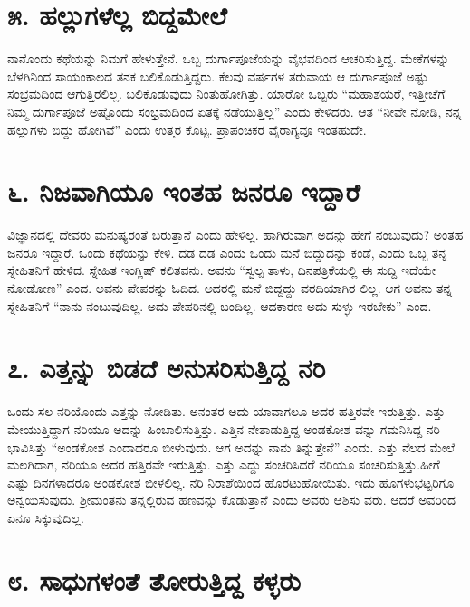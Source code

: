 \section{\num{೫.} ಹಲ್ಲುಗಳೆಲ್ಲ ಬಿದ್ದಮೇಲೆ}

ನಾನೊಂದು ಕಥೆಯನ್ನು ನಿಮಗೆ ಹೇಳುತ್ತೇನೆ. ಒಬ್ಬ ದುರ್ಗಾಪೂಜೆಯನ್ನು ವೈಭವದಿಂದ ಆಚರಿಸುತ್ತಿದ್ದ. ಮೇಕೆಗಳನ್ನು ಬೆಳಗಿನಿಂದ ಸಾಯಂಕಾಲದ ತನಕ ಬಲಿಕೊಡುತ್ತಿದ್ದರು. ಕೆಲವು ವರ್ಷಗಳ ತರುವಾಯ ಆ ದುರ್ಗಾಪೂಜೆ ಅಷ್ಟು ಸಂಭ್ರಮದಿಂದ ಆಗುತ್ತಿರಲಿಲ್ಲ. ಬಲಿಕೊಡುವುದು ನಿಂತುಹೋಗಿತ್ತು. ಯಾರೋ ಒಬ್ಬರು “ಮಹಾಶಯರೆ, ಇತ್ತೀಚೆಗೆ ನಿಮ್ಮ ದುರ್ಗಾಪೂಜೆ ಅಷ್ಟೊಂದು ಸಂಭ್ರಮದಿಂದ ಏತಕ್ಕೆ ನಡೆಯುತ್ತಿಲ್ಲ” ಎಂದು ಕೇಳಿದರು. ಆತ “ನೀವೇ ನೋಡಿ, ನನ್ನ ಹಲ್ಲುಗಳು ಬಿದ್ದು ಹೋಗಿವೆ” ಎಂದು ಉತ್ತರ ಕೊಟ್ಟ. ಪ್ರಾಪಂಚಿಕರ ವೈರಾಗ್ಯವೂ ಇಂತಹುದೇ.


\section{\num{೬.} ನಿಜವಾಗಿಯೂ ಇಂತಹ ಜನರೂ ಇದ್ದಾರೆ}

ವಿಜ್ಞಾನದಲ್ಲಿ ದೇವರು ಮನುಷ್ಯರಂತೆ ಬರುತ್ತಾನೆ ಎಂದು ಹೇಳಿಲ್ಲ. ಹಾಗಿರುವಾಗ ಅದನ್ನು ಹೇಗೆ ನಂಬುವುದು? ಅಂತಹ ಜನರೂ ಇದ್ದಾರೆ. ಒಂದು ಕಥೆಯನ್ನು ಕೇಳಿ. ದಡ ದಡ ಎಂದು ಒಂದು ಮನೆ ಬಿದ್ದುದನ್ನು ಕಂಡೆ, ಎಂದು ಒಬ್ಬ ತನ್ನ ಸ್ನೇಹಿತನಿಗೆ ಹೇಳಿದ. ಸ್ನೇಹಿತ ಇಂಗ್ಲಿಷ್ ಕಲಿತವನು. ಅವನು “ಸ್ವಲ್ಪ ತಾಳು, ದಿನಪತ್ರಿಕೆಯಲ್ಲಿ ಈ ಸುದ್ದಿ ಇದೆಯೇ ನೋಡೋಣ” ಎಂದ. ಅವನು ಪೇಪರನ್ನು ಓದಿದ. ಅದರಲ್ಲಿ ಮನೆ ಬಿದ್ದದ್ದು ವರದಿಯಾಗಿರ ಲಿಲ್ಲ. ಆಗ ಅವನು ತನ್ನ ಸ್ನೇಹಿತನಿಗೆ “ನಾನು ನಂಬುವುದಿಲ್ಲ. ಅದು ಪೇಪರಿನಲ್ಲಿ ಬಂದಿಲ್ಲ. ಆದಕಾರಣ ಅದು ಸುಳ್ಳು ಇರಬೇಕು” ಎಂದ.


\section{\num{೭.} ಎತ್ತನ್ನು ಬಿಡದೆ ಅನುಸರಿಸುತ್ತಿದ್ದ ನರಿ}

ಒಂದು ಸಲ ನರಿಯೊಂದು ಎತ್ತನ್ನು ನೋಡಿತು. ಅನಂತರ ಅದು ಯಾವಾಗಲೂ ಅದರ ಹತ್ತಿರವೇ ಇರುತ್ತಿತ್ತು. ಎತ್ತು ಮೇಯುತ್ತಿದ್ದಾಗ ನರಿಯೂ ಅದನ್ನು ಹಿಂಬಾಲಿಸುತ್ತಿತ್ತು. ಎತ್ತಿನ ನೇತಾಡುತ್ತಿದ್ದ ಅಂಡಕೋಶ ವನ್ನು ಗಮನಿಸಿದ್ದ ನರಿ ಭಾವಿಸಿತ್ತು “ಅಂಡಕೋಶ ಎಂದಾದರೂ ಬೀಳುವುದು. ಆಗ ಅದನ್ನು ನಾನು ತಿನ್ನುತ್ತೇನೆ” ಎಂದು. ಎತ್ತು ನೆಲದ ಮೇಲೆ ಮಲಗಿದಾಗ, ನರಿಯೂ ಅದರ ಹತ್ತಿರವೇ ಇರುತ್ತಿತ್ತು. ಎತ್ತು ಎದ್ದು ಸಂಚರಿಸಿದರೆ ನರಿಯೂ ಸಂಚರಿಸುತ್ತಿತ್ತು.ಹೀಗೆ ಎಷ್ಟು ದಿನಗಳಾದರೂ ಅಂಡಕೋಶ ಬೀಳಲಿಲ್ಲ. ನರಿ ನಿರಾಶೆಯಿಂದ ಹೊರಟುಹೋಯಿತು. ಇದು ಹೊಗಳುಭಟ್ಟರಿಗೂ ಅನ್ವಯಿಸುವುದು. ಶ್ರೀಮಂತನು ತನ್ನಲ್ಲಿರುವ ಹಣವನ್ನು ಕೊಡುತ್ತಾನೆ ಎಂದು ಅವರು ಆಶಿಸು ವರು. ಆದರೆ ಅವರಿಂದ ಏನೂ ಸಿಕ್ಕುವುದಿಲ್ಲ.


\section{\num{೮.} ಸಾಧುಗಳಂತೆ ತೋರುತ್ತಿದ್ದ ಕಳ್ಳರು}

